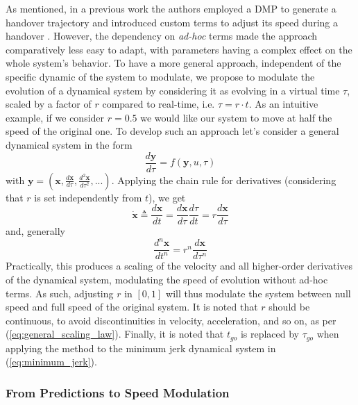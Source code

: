 \documentclass[lettersize,journal]{IEEEtran}
\newcommand{\x}{\bm x}
\newcommand{\xd}{\dot{\bm x}}
\newcommand{\y}{\bm y}
\begin{document}
As mentioned, in a previous work the authors employed a DMP to generate a handover trajectory and introduced custom terms to adjust its speed during a handover \cite{iori_dmp-based_2023}.
However, the dependency on \textit{ad-hoc} terms made the approach comparatively less easy to adapt, with parameters having a complex effect on the whole system's behavior.
To have a more general approach, independent of the specific dynamic of the system to modulate, we propose to modulate the evolution of a dynamical system by considering it as evolving in a virtual time $\tau$, scaled by a factor of $r$ compared to real-time, i.e. $\tau = r \cdot t$.
As an intuitive example, if we consider $r=0.5$ we would like our system to move at half the speed of the original one.
To develop such an approach let's consider a general dynamical system in the form
\begin{equation}
    \frac{d \y}{d\tau} = f(\y, u, \tau)
\end{equation}
with $\y = (\x, \frac{d\x}{d \tau}, \frac{d^2\x}{d \tau^2}, ...)$.
Applying the chain rule for derivatives (considering that $r$ is set independently from $t$), we get
\begin{equation}
     \xd \triangleq \frac{d\x}{d t} = \frac{d\x}{d \tau} \frac{d\tau}{d t} = r \frac{d\x}{d \tau} 
\end{equation}
and, generally
\begin{equation}
\label{eq:general_scaling_law}
     \frac{d^n\x}{d t^n} = r^n \frac{d\x}{d \tau^n} 
\end{equation}
Practically, this produces a scaling of the velocity and all higher-order derivatives of the dynamical system, modulating the speed of evolution without ad-hoc terms.
As such, adjusting $r$ in $[0,1]$ will thus modulate the system between null speed and full speed of the original system. 
It is noted that $r$ should be continuous, to avoid discontinuities in velocity, acceleration, and so on, as per (\ref{eq:general_scaling_law}).
Finally, it is noted that $t_{go}$ is replaced by $\tau_{go}$ when applying the method to the minimum jerk dynamical system in (\ref{eq:minimum_jerk}).


\subsubsection{From Predictions to Speed Modulation}
\end{document}

